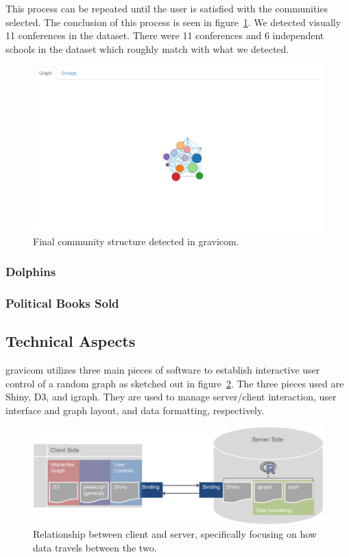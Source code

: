 \documentclass{article}\usepackage[]{graphicx}\usepackage[]{color}
\begin{document}
This process can be repeated until the user is satisfied with the communities selected. The conclusion of this process is seen in figure~\ref{fig:football_8}. We detected visually 11 conferences in the dataset. There were 11 conferences and 6 independent schools in the dataset which roughly match with what we detected. 

\begin{figure}[hbtp]
\centering
\includegraphics[width=\textwidth]{images/football_8.png}
\caption{\label{fig:football_8} Final community structure detected in gravicom.}
\end{figure}


\subsubsection{Dolphins}

\subsubsection{Political Books Sold}



\subsection{Technical Aspects}

gravicom utilizes three main pieces of software to establish interactive user control of a random graph as sketched out in figure~\ref{fig:clientserver}. The three pieces used are Shiny, D3, and igraph. They are used to manage server/client interaction, user interface and graph layout, and data formatting, respectively.

\begin{figure}[hbtp]
\centering
\includegraphics[width=\textwidth]{images/clientserverflow.png}
\caption{\label{fig:clientserver} Relationship between client and server, specifically focusing on how data travels between the two.}
\end{figure}
\end{document}

